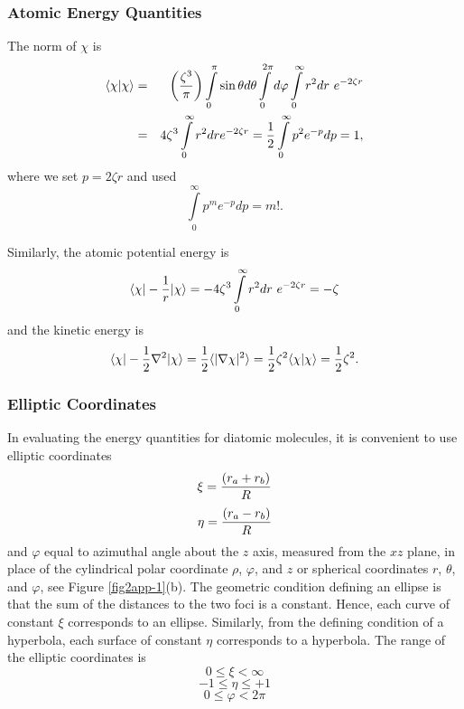 \subsubsection{Atomic Energy Quantities}

The norm of $\chi$ is
\begin{eqnarray}
\langle \chi \vert \chi \rangle &=& \left( {\zeta^3 \over \pi} \right) 
\int\limits^{\pi}_{0} \sin \theta d \theta \int\limits^{2 \pi}_{0}  
d \varphi \int\limits^{\infty}_{0} r^2 dr\ e^{-2 \zeta r}\cr
&=& 4 \zeta^3 \int\limits^{\infty}_{0} r^2 dre^{-2 \zeta r} = {1 \over 
2} \int\limits^{\infty}_{0} p^2 e^{-p} dp = 1,
\end{eqnarray}
where we set $p = 2 \zeta r$ and used
\begin{equation}
\int\limits^{\infty}_{0} p^m e^{-p} dp = m !.
\end{equation}

Similarly, the atomic potential energy is
\begin{equation}
\langle \chi \vert - {1 \over r} \vert \chi \rangle = - 4 \zeta^3 
\int\limits^{\infty}_{0} r^2 dr\ e^{-2 \zeta r} = - \zeta
\end{equation}
and the kinetic energy is
\begin{equation}
\langle \chi \vert - {1 \over 2} \nabla^2 \vert \chi \rangle = {1 
\over 2} \langle \vert \nabla \chi \vert^2 \rangle = {1 \over 2} 
\zeta^2 \langle \chi \vert \chi \rangle = {1 \over 2} \zeta^2.
\end{equation}

\subsubsection{Elliptic Coordinates}

In evaluating the energy quantities for diatomic molecules, it is convenient 
to use elliptic coordinates
\begin{equation}
\xi = {\left( r_a + r_b \right) \over R}
\label{eqno2app-2a}
\end{equation}
\begin{equation}
\eta = {\left( r_a - r_b \right) \over R}
\label{eqno2app-2b}
\end{equation}
and $\varphi$ equal to azimuthal angle about the $z$ axis, measured
from the $xz$ plane, in place of the cylindrical polar coordinate
$\rho$, $\varphi$, and $z$ or spherical coordinates $r$, $\theta$, and
$\varphi$, see Figure \ref{fig2app-1}(b). The geometric condition
defining an ellipse is that the sum of the distances to the two foci
is a constant. Hence, each curve of constant $\xi$ corresponds to an
ellipse. Similarly, from the defining condition of a hyperbola, each
surface of constant $\eta$ corresponds to a hyperbola. The range of
the elliptic coordinates is
\begin{equation}
0 \leq \xi < \infty
\end{equation}
\begin{equation} 
-1 \leq \eta \leq + 1
\end{equation}
\begin{equation}
0 \leq \varphi < 2 \pi
\end{equation}

